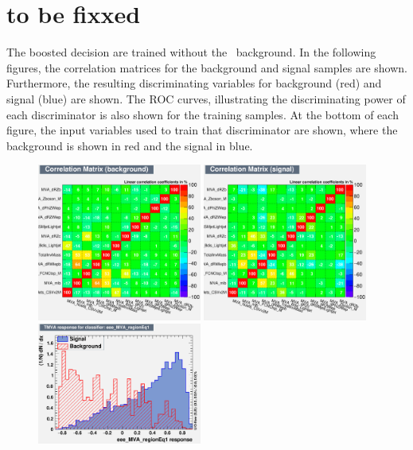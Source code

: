 \section{to be fixxed}
The boosted decision are trained without the \NPL\ background. In the following figures, the correlation matrices for the background and signal samples are shown. Furthermore, the resulting discriminating variables for background (red) and signal (blue) are shown. The ROC curves, illustrating the discriminating power of each discriminator is also shown for the training samples. At the bottom of each figure, the input variables used to train that discriminator are shown, where the background is shown in red and the signal in blue.
\begin{figure}[htbp]
	\includegraphics[width=0.48\textwidth]{6_Search/Figures/MVAtechnics/toppairzct/eee/CorrelationMatrixB.png}
	\includegraphics[width=0.48\textwidth]{6_Search/Figures/MVAtechnics/toppairzct/eee/CorrelationMatrixS.png}
	\includegraphics[width=0.48\textwidth]{6_Search/Figures/MVAtechnics/toppairzct/eee/mva_eee_MVA_regionEq1.png}

\end{figure}
